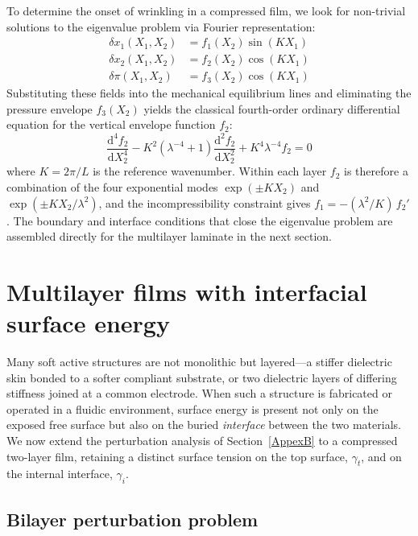 \documentclass[final,3p,times]{elsarticle}
\begin{document}
To determine the onset of wrinkling in a compressed film, we look for non-trivial solutions to the eigenvalue problem via Fourier representation:
\begin{equation}
	\begin{aligned}
		\delta x_{1}(X_1,X_2) &= f_{1}(X_2)\sin( K X_1) \\
		\delta x_{2}(X_1,X_2) &= f_{2}(X_2)\cos(K X_1) \\
		\delta \pi(X_1,X_2) &= f_{3}(X_2)\cos(K X_1)
	\end{aligned}
	\label{eq:per_sol}
\end{equation}
Substituting these fields into the mechanical equilibrium lines and eliminating the pressure envelope $f_3(X_2)$ yields the classical fourth-order ordinary differential equation for the vertical envelope function $f_2$:
\begin{equation}
	\frac{\mathrm{d}^4 f_2}{\mathrm{d}X_2^4} - K^2\left(\lambda^{-4}+1\right)\frac{\mathrm{d}^2 f_2}{\mathrm{d}X_2^2} + K^4{\lambda}^{-4}f_2=0
		\label{eq:ODE_2}
\end{equation}
where $K=2\pi/L$ is the reference wavenumber. Within each layer $f_2$ is therefore a combination of the four exponential modes $\exp(\pm K X_2)$ and $\exp(\pm K X_2/\lambda^2)$, and the incompressibility constraint gives $f_1=-(\lambda^2/K)\,f_2'$. The boundary and interface conditions that close the eigenvalue problem are assembled directly for the multilayer laminate in the next section.

\section{Multilayer films with interfacial surface energy}
\label{sec:multilayer}

Many soft active structures are not monolithic but layered---a stiffer
dielectric skin bonded to a softer compliant substrate, or two
dielectric layers of differing stiffness joined at a common
electrode. When such a structure is fabricated or operated in a fluidic
environment, surface energy is present not only on the exposed free
surface but also on the buried \emph{interface} between the two
materials. We now extend the perturbation analysis of
Section~\ref{AppexB} to a compressed two-layer film, retaining a
distinct surface tension on the top surface, $\gamma_t$, and on the
internal interface, $\gamma_i$.

\subsection{Bilayer perturbation problem}
\end{document}
